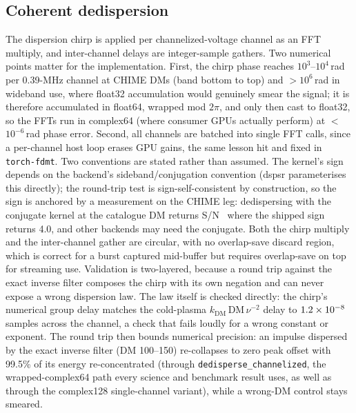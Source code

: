\documentclass[twocolumn]{aastex631}
\newcommand{\code}[1]{\texttt{#1}}
\begin{document}
\subsection{Coherent dedispersion}
The dispersion chirp \citep{hankins1975} is applied per channelized-voltage channel as an
FFT multiply, and inter-channel delays are integer-sample gathers. Two numerical points
matter for the implementation. First, the chirp phase reaches $10^3$--$10^4$\,rad per
0.39-MHz channel at CHIME DMs (band bottom to top) and $>$$10^6$\,rad in wideband use, where
float32 accumulation would genuinely smear the signal; it is therefore accumulated in
float64, wrapped mod $2\pi$, and only then cast to float32, so the FFTs run in complex64
(where consumer GPUs actually perform) at $<$$10^{-6}$\,rad phase error. Second, all
channels are batched into single FFT calls, since a per-channel host loop erases GPU gains,
the same lesson hit and fixed in \code{torch-fdmt}. Two conventions are stated rather than
assumed. The kernel's sign depends on the backend's sideband/conjugation convention (dspsr
parameterises this directly); the round-trip test is sign-self-consistent by construction,
so the sign is anchored by a measurement on the CHIME leg: dedispersing with the
conjugate kernel at the catalogue DM returns S/N \tdRealChimeConjSnr\ where the shipped sign
returns 4.0, and other backends may need the conjugate. Both the chirp multiply and the
inter-channel gather are circular, with no overlap-save discard region, which is correct for
a burst captured mid-buffer but requires overlap-save on top for streaming use. Validation
is two-layered, because a round trip against the exact inverse filter composes the chirp
with its own negation and can never expose a wrong dispersion law. The law itself is checked
directly: the chirp's numerical group delay matches the cold-plasma
$k_\mathrm{DM}\,\mathrm{DM}\,\nu^{-2}$ delay to $1.2\times10^{-8}$ samples across the
channel, a check that fails loudly for a wrong constant or exponent. The round trip then
bounds numerical precision: an impulse dispersed by the exact inverse filter (DM 100--150)
re-collapses to zero peak offset with 99.5\% of its energy re-concentrated (through
\code{dedisperse\_channelized}, the wrapped-complex64 path every science and benchmark
result uses, as well as through the complex128 single-channel variant), while a wrong-DM
control stays smeared.
\end{document}
